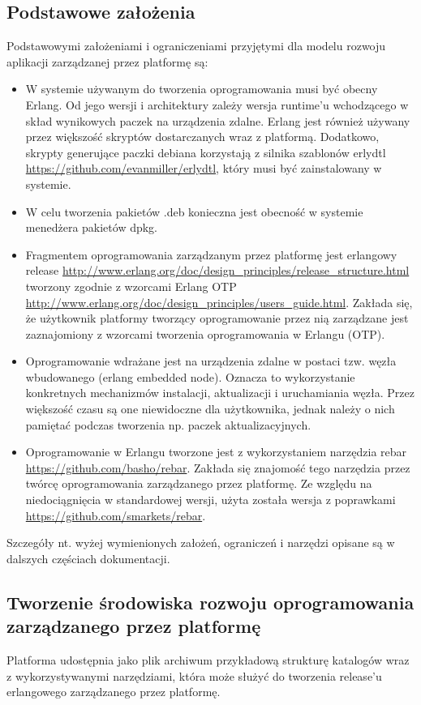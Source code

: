 \documentclass[polish,12pt]{aghthesis}
\begin{document}
\subsection{Podstawowe założenia}
Podstawowymi założeniami i ograniczeniami przyjętymi dla modelu rozwoju aplikacji zarządzanej przez platformę są:
\begin{itemize}
\item W systemie używanym do tworzenia oprogramowania musi być obecny Erlang. Od jego wersji i architektury zależy wersja runtime'u wchodzącego w skład wynikowych paczek na urządzenia zdalne. Erlang jest również używany przez większość skryptów dostarczanych wraz z platformą. Dodatkowo, skrypty generujące paczki debiana korzystają z silnika szablonów  erlydtl \url{https://github.com/evanmiller/erlydtl}, który musi być zainstalowany w systemie.
\item W celu tworzenia pakietów .deb konieczna jest obecność w systemie menedżera pakietów dpkg.
\item Fragmentem oprogramowania zarządzanym przez platformę jest erlangowy  release \url{http://www.erlang.org/doc/design_principles/release_structure.html} tworzony zgodnie z wzorcami Erlang OTP \url{http://www.erlang.org/doc/design_principles/users_guide.html}. Zakłada się, że użytkownik platformy tworzący oprogramowanie przez nią zarządzane jest zaznajomiony z wzorcami tworzenia oprogramowania w Erlangu (OTP).
\item Oprogramowanie wdrażane jest na urządzenia zdalne w postaci tzw. węzła wbudowanego (erlang embedded node). Oznacza to wykorzystanie konkretnych mechanizmów instalacji, aktualizacji i uruchamiania węzła. Przez większość czasu są one niewidoczne dla użytkownika, jednak należy o nich pamiętać podczas tworzenia np. paczek aktualizacyjnych.
\item Oprogramowanie w Erlangu tworzone jest z wykorzystaniem narzędzia rebar \url{https://github.com/basho/rebar}. Zakłada się znajomość tego narzędzia przez twórcę oprogramowania zarządzanego przez platformę. Ze względu na niedociągnięcia w standardowej wersji, użyta została  wersja z poprawkami \url{https://github.com/smarkets/rebar}.
\end{itemize}

Szczegóły nt. wyżej wymienionych założeń, ograniczeń i narzędzi opisane są w dalszych częściach dokumentacji.

\subsection{Tworzenie środowiska rozwoju oprogramowania zarządzanego przez platformę}
Platforma udostępnia jako plik archiwum przykładową strukturę katalogów wraz z wykorzystywanymi narzędziami, która może służyć do tworzenia release'u erlangowego zarządzanego przez platformę.
\end{document}
